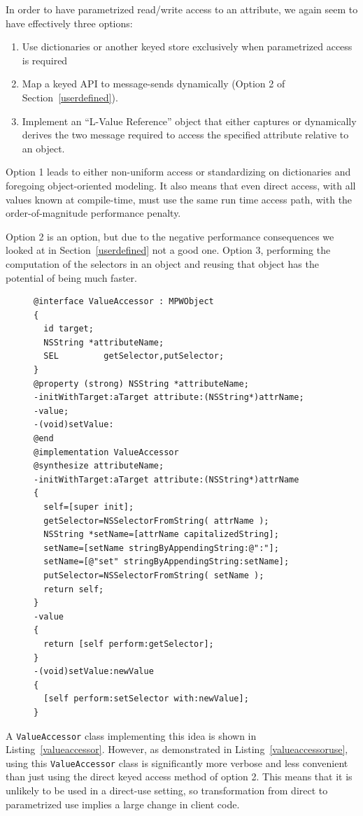 \documentclass[preprint]{sigplanconf}
\begin{document}
In order to have parametrized read/write access to an attribute, we again seem to have effectively
three options:

\begin{enumerate}
\item Use dictionaries or another keyed store exclusively when parametrized access is required
\item Map a keyed API to message-sends dynamically (Option 2 of Section~\ref{userdefined}).
\item Implement an ``L-Value Reference'' object that either captures or dynamically derives 
	the two message required to access the specified attribute relative to an object.
\end{enumerate}


Option 1 leads to either non-uniform access or standardizing on dictionaries and foregoing 
object-oriented modeling.   It also means that even direct access, with all values known
at compile-time, must use the same run time access path, with the order-of-magnitude
performance penalty.
 
Option 2 is an option, but due to the negative performance
consequences we looked at in
Section~\ref{userdefined} not a good one.   Option 3,  performing the computation of the selectors
in an object and reusing that object has the potential of being much faster. 

\begin{figure}[htbp]
\begin{lstlisting}[style=numbers,label=valueaccessor,caption=Class encapsulating message-based attribute access.]
@interface ValueAccessor : MPWObject
{
  id target;
  NSString *attributeName;
  SEL         getSelector,putSelector;
}
@property (strong) NSString *attributeName;
-initWithTarget:aTarget attribute:(NSString*)attrName;
-value;
-(void)setValue:
@end
@implementation ValueAccessor
@synthesize attributeName;
-initWithTarget:aTarget attribute:(NSString*)attrName
{
  self=[super init];
  getSelector=NSSelectorFromString( attrName );
  NSString *setName=[attrName capitalizedString];
  setName=[setName stringByAppendingString:@":"];
  setName=[@"set" stringByAppendingString:setName];
  putSelector=NSSelectorFromString( setName );
  return self;
}
-value
{
  return [self perform:getSelector];
}
-(void)setValue:newValue
{
  [self perform:setSelector with:newValue];
}
\end{lstlisting}
\end{figure}

A {\tt ValueAccessor} class implementing this idea is shown in Listing~\ref{valueaccessor}.  However, 
as demonstrated in Listing~\ref{valueaccessoruse}, using this
{\tt ValueAccessor} class is significantly more verbose and less convenient than just using the 
direct keyed access method of option 2.  This means that it is unlikely to be used in a direct-use
setting, so transformation from direct to parametrized use implies a large change in client code.
\end{document}
